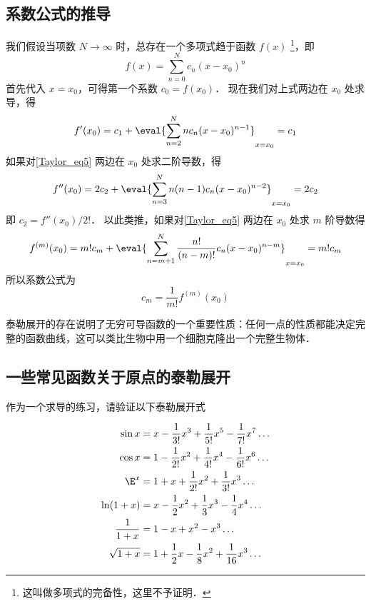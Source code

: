 \subsection{系数公式的推导}
我们假设当项数 $N \to \infty$ 时，总存在一个多项式趋于函数 $f(x)$ \footnote{这叫做多项式的完备性，这里不予证明．}，即
\begin{equation}\label{Taylor_eq5}
f(x) = \sum_{n = 0}^N  c_n (x - x_0)^n
\end{equation}
首先代入 $x = x_0$，可得第一个系数 $c_0 = f(x_0)$． 现在我们对上式两边在 $x_0$ 处求导，得
\begin{equation}
f'(x_0) = c_1 + \eval{ \sum_{n = 2}^N n c_n (x - x_0)^{n - 1} }_{x = x_0}  = c_1
\end{equation}
如果对\autoref{Taylor_eq5} 两边在 $x_0$ 处求二阶导数，得
\begin{equation}
f''(x_0) = 2 c_2 + \eval{ \sum_{n = 3}^N  n(n - 1) c_n (x - x_0)^{n - 2} }_{x = x_0}  = 2 c_2
\end{equation}
即 $c_2 = f''(x_0)/2!$．  以此类推，如果对\autoref{Taylor_eq5} 两边在 $x_0$ 处求 $m$ 阶导数得
\begin{equation}
f^{(m)}(x_0) = m! c_m + \eval{ \sum_{n = m + 1}^N  \frac{n!}{(n - m)!} c_n (x - x_0)^{n - m} }_{x = x_0}  = m! c_m
\end{equation}
所以系数公式为
\begin{equation}
{c_m} = \frac{1}{m!} f^{(m)}(x_0)
\end{equation}

泰勒展开的存在说明了无穷可导函数的一个重要性质：任何一点的性质都能决定完整的函数曲线，这可以类比生物中用一个细胞克隆出一个完整生物体．

\subsection{一些常见函数关于原点的泰勒展开}
作为一个求导的练习，请验证以下泰勒展开式

\begin{align}
\sin x &= x - \frac{1}{3!} x^3 + \frac{1}{5!} x^5 - \frac{1}{7!} x^7 \ldots\\
\cos x &= 1 - \frac{1}{2!} x^2 + \frac{1}{4!} x^4 -\frac{1}{6!} x^6 \ldots\\
\E^x &=1 + x + \frac{1}{2!} x^2 + \frac{1}{3!} x^3  \ldots\\
\ln (1+x) &= x - \frac12 x^2 + \frac13 x^3 - \frac14 x^4 \ldots\\
\frac{1}{1+x} &= 1 - x + x^2 - x^3 \ldots\\
\sqrt{1+x} &= 1 + \frac12 x - \frac18 x^2 + \frac{1}{16} x^3 \ldots
\end{align}

